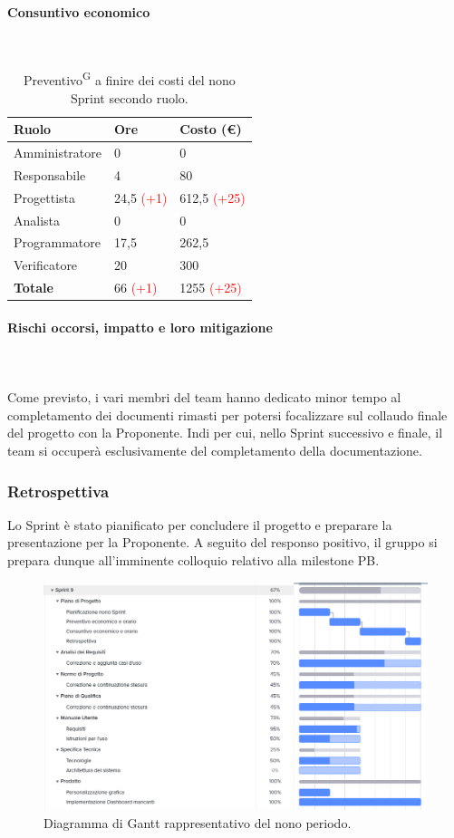 \documentclass[8pt]{article}
\newcommand{\glossterm}[1]{#1\textsuperscript{G}} %
\newcommand{\subsubsubsection}[1]{\paragraph{#1}\mbox{}\\}
\begin{document}
\subsubsubsection{Consuntivo economico}
\begin{table}[ht!]
    \centering
    \begin{tabular}{p{4cm} p{1.8cm} p{2.2cm}}
        \toprule
        \textbf{Ruolo} & \textbf{Ore} & \textbf{Costo (€)} \\
        \midrule
        Amministratore & 0 & 0 \\ 
        Responsabile & 4 & 80 \\ 
        Progettista & 24,5 \textcolor{red}{(+1)} & 612,5 \textcolor{red}{(+25)} \\ 
        Analista & 0 & 0 \\ 
        Programmatore & 17,5 & 262,5 \\ 
        Verificatore & 20 & 300 \\ 
        \midrule
        \textbf{Totale} & 66 \textcolor{red}{(+1)} & 1255 \textcolor{red}{(+25)} \\ 
        \bottomrule
    \end{tabular}
    \caption{\glossterm{Preventivo} a finire dei costi del nono Sprint secondo ruolo.}
    \label{table:Preventivo a finire dei costi del non Sprint secondo ruolo}
\end{table}
\subsubsubsection{Rischi occorsi, impatto e loro mitigazione} \\
Come previsto, i vari membri del team hanno dedicato minor tempo al completamento dei documenti rimasti per potersi focalizzare sul collaudo finale del progetto con la Proponente. Indi per cui, nello Sprint successivo e finale, il team si occuperà esclusivamente del completamento della documentazione.
\subsubsection{Retrospettiva}
Lo Sprint è stato pianificato per concludere il progetto e preparare la presentazione per la Proponente. A seguito del responso positivo, il gruppo si prepara dunque all'imminente colloquio relativo alla milestone PB. 
\begin{figure}[h!]
    \centering
    \includegraphics[width=13cm]{./images_pdp/gantt9.png}
    \caption{Diagramma di Gantt rappresentativo del nono periodo.}
\end{figure}
\clearpage
\newpage
\end{document}

